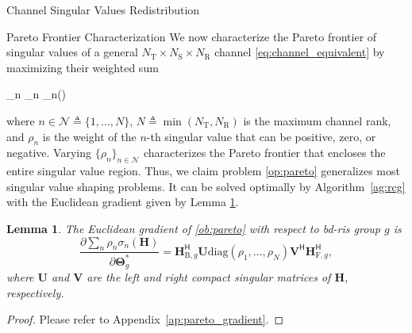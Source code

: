 \documentclass[journal]{IEEEtran}
\newtheorem{lemma}{Lemma}
\begin{document}
\begin{section}{Channel Singular Values Redistribution}
	\begin{subsection}{Pareto Frontier Characterization}\label{sc:pareto_frontier}
		We now characterize the Pareto frontier of singular values of a general $N_\mathrm{T} \times N_\mathrm{S} \times N_\mathrm{R}$ channel \eqref{eq:channel_equivalent} by maximizing their weighted sum
		\begin{maxi!}
			{\scriptstyle{\mathbf{\Theta}}}{\sum_n \rho_n \sigma_n()}{\label{op:pareto}}{\label{ob:pareto}}
		\end{maxi!}
		where $n \in \mathcal{N} \triangleq \{1,\ldots,N\}$, $N \triangleq \min(N_\mathrm{T}, N_\mathrm{R})$ is the maximum channel rank, and $\rho_n$ is the weight of the $n$-th singular value that can be positive, zero, or negative.
		Varying $\{\rho_n\}_{n \in \mathcal{N}}$ characterizes the Pareto frontier that encloses the entire singular value region.
		Thus, we claim problem \eqref{op:pareto} generalizes most singular value shaping problems.
		It can be solved optimally by Algorithm~\ref{ag:rcg} with the Euclidean gradient given by Lemma \ref{lm:pareto_gradient}.

		\begin{lemma}\label{lm:pareto_gradient}
			The Euclidean gradient of \eqref{ob:pareto} with respect to \gls{bd}-\gls{ris} group $g$ is
			\begin{equation}
				\frac{\partial \sum_n \rho_n \sigma_n(\mathbf{H})}{\partial \mathbf{\Theta}_g^*} = \mathbf{H}_{\mathrm{B},g}^\mathsf{H} \mathbf{U} \mathrm{diag}(\rho_1,\ldots,\rho_N) \mathbf{V}^\mathsf{H} \mathbf{H}_{\mathrm{F},g}^\mathsf{H},
				\label{eq:pareto_gradient}
			\end{equation}
			where $\mathbf{U}$ and $\mathbf{V}$ are the left and right compact singular matrices of $\mathbf{H}$, respectively.
		\end{lemma}
		\begin{proof}
			Please refer to Appendix~\ref{ap:pareto_gradient}.
		\end{proof}


\end{subsection}
\end{section}
\end{document}
